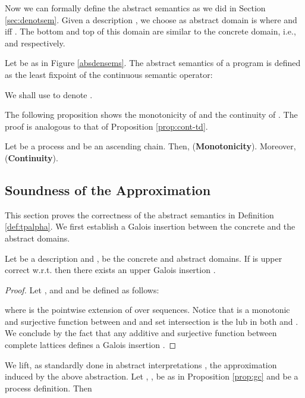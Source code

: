 \documentclass{tlp}
\begin{document}
Now we can formally define the abstract semantics as we did in Section \ref{sec:denotsem}. Given a description , we choose as  abstract domain is  where 
  and  iff . 
The bottom and top of this domain are similar to the concrete domain, i.e.,   and  respectively.



\begin{definition}\label{def:tpalpha}  Let   be  as in Figure \ref{absdensems}. The abstract semantics of a program  is defined as the 
least fixpoint of the  continuous  semantic operator:

We shall use  to denote .
\end{definition} 

The following proposition shows the monotonicity of  and 
the continuity of . The proof is analogous to that of Proposition  \ref{prop:cont-td}.

\begin{proposition}
Let  be a process and   be an ascending chain. Then, 
 ({\bf Monotonicity}). Moreover,   ({\bf Continuity}). 
\end{proposition}



\subsection{Soundness of the Approximation}
This section proves the correctness of the abstract semantics in Definition \ref{def:tpalpha}. We first establish a Galois insertion between the concrete and the abstract domains. 


\begin{proposition}\label{prop:gc}
Let  be a description and ,   be  the concrete and  abstract domains.  If  is  upper correct w.r.t.   then there exists an upper Galois insertion . 
\end{proposition}
\begin{proof}
Let ,  and    and  be defined as follows:

where  is the pointwise extension of  over sequences. Notice that  is a monotonic and surjective function between  and  and set intersection is the lub in both  and . We conclude by the fact that any additive and surjective function between complete lattices defines a Galois insertion \cite{CC79}. 
\end{proof}

 We  lift, as  standardly done in abstract interpretations \cite{CC92},
the approximation induced by the above abstraction. 
Let , ,  be as in Proposition \ref{prop:gc} 
and  be a process definition. Then
\end{document}
